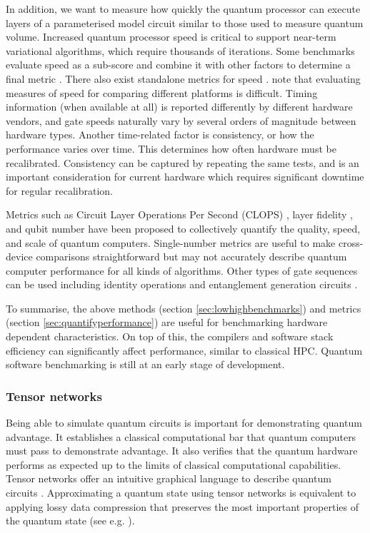 \documentclass[10pt]{iopart}
\begin{document}
In addition, we want to measure how quickly the quantum processor can execute layers of a parameterised model circuit similar to those used to measure quantum volume. Increased quantum processor speed is critical to support near-term variational algorithms, which require thousands of iterations. Some benchmarks evaluate speed as a sub-score and combine it with other factors to determine a final metric \cite{Donkers2022}. There also exist standalone metrics for speed \cite{Wack2021}. \citeauthor{Lubinski2023} \cite{Lubinski2023} note that evaluating measures of speed for comparing different platforms is difficult. Timing information (when available at all) is reported differently by different hardware vendors, and gate speeds naturally vary by several orders of magnitude between hardware types. Another time-related factor is consistency, or how the performance varies over time. This determines how often hardware must be recalibrated. Consistency can be captured by repeating the same tests, and is an important consideration for current hardware which requires significant downtime for regular recalibration.

Metrics such as Circuit Layer Operations Per Second (CLOPS) \cite{Wack2021}, layer fidelity \cite{McKay2023}, and qubit number have been proposed to collectively quantify the quality, speed, and scale of quantum computers. Single-number metrics are useful to make cross-device comparisons straightforward but may not accurately describe quantum computer performance for all kinds of algorithms.  Other types of gate sequences can be used including identity operations and entanglement generation circuits \cite{Michielsen2017}.

To summarise, the above methods (section \ref{sec:lowhighbenchmarks}) and metrics (section \ref{sec:quantifyperformance}) are useful for benchmarking hardware dependent characteristics.  On top of this, the compilers and software stack efficiency can significantly affect performance, similar to classical HPC.  Quantum software benchmarking is still at an early stage of development.


\subsubsection{Tensor networks}\label{sec:TNbenchmark}\hfill

Being able to simulate quantum circuits is important for demonstrating quantum advantage. It establishes a classical computational bar that quantum computers must pass to demonstrate advantage. It also verifies that the quantum hardware performs as expected up to the limits of classical computational capabilities. Tensor networks offer an intuitive graphical language to describe quantum circuits \cite{Orus2019t}. Approximating a quantum state using tensor networks is equivalent to applying lossy data compression that preserves the most important properties of the quantum state (see e.g. \cite{Orus2014,Huggins2019}). 
\end{document}
